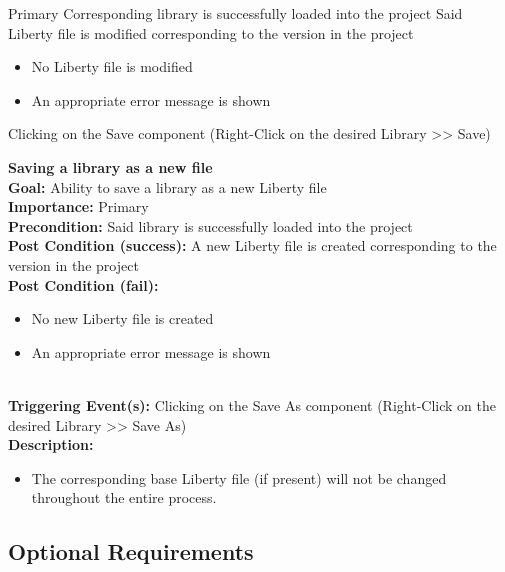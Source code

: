 \documentclass[10pt,a4paper]{report}
\newcommand{\precondition}[1]{
    \textbf{Precondition: } #1 \leavevmode \\
}
\newcommand{\FRDescription}[8]{
    \textbf{#1} \leavevmode \\
    \textbf{Goal: } #2 \leavevmode \\
    \textbf{Importance: } #3 \leavevmode \\
    \precondition{#4}
    \textbf{Post Condition (success): } #5 \leavevmode \\
    \textbf{Post Condition (fail): } #6 \leavevmode \\
    \textbf{Triggering Event(s): } #7 \leavevmode \\
    \textbf{Description: } \leavevmode \\ 
    #8}
\begin{document}
\begin{FR}
    {Primary}
    {Corresponding library is successfully loaded into the project}
    {Said Liberty file is modified corresponding to the version in the project}
    {\begin{itemize}
        \item No Liberty file is modified
        \item An appropriate error message is shown
    \end{itemize}}
    {Clicking on the Save component (Right-Click on the desired Library  >> Save)}
    \item \FRDescription{Saving a library as a new file}
    {Ability to save a library as a new Liberty file}
    {Primary}
    {Said library is successfully loaded into the project}
    {A new Liberty file is created corresponding to the version in the project}
    {\begin{itemize}
        \item No new Liberty file is created
        \item An appropriate error message is shown
    \end{itemize}}
    {Clicking on the Save As component (Right-Click on the desired Library  >> Save As)}
    {\begin{itemize}
        \item The corresponding base Liberty file (if present) will not be changed throughout the entire process.
    \end{itemize}}
\end{FR}

\subsection{Optional Requirements}
\end{document}
